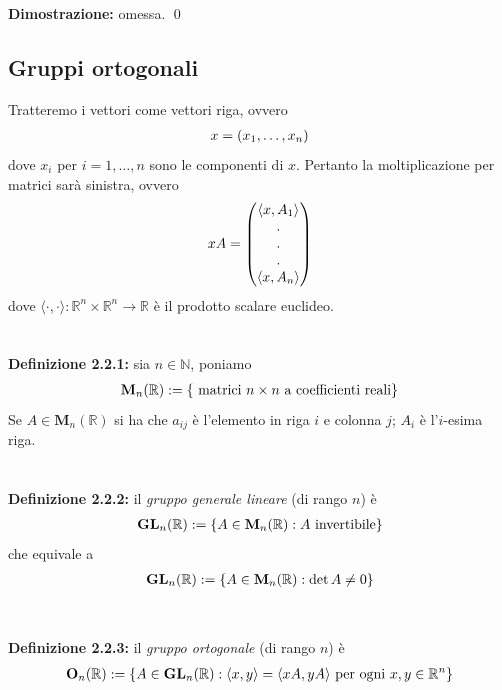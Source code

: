 \documentclass{article}
\begin{document}
\textbf{Dimostrazione:} omessa. \qed
\newpage
\subsection{Gruppi ortogonali}
Tratteremo i vettori come vettori riga, ovvero
\begin{gather}
    x = (x_1, \dots, x_n) \notag
\end{gather}
dove $x_i$ per $i = 1, \dots, n$ sono le componenti di $x$. Pertanto la moltiplicazione per matrici sarà sinistra, ovvero
\begin{gather}
    xA = \begin{pmatrix}
        \langle x, A_1 \rangle \\
        . \\
        . \\
        . \\
        \langle x, A_n \rangle
    \end{pmatrix} \notag
\end{gather}
dove $\langle \cdot, \cdot \rangle : \mathbb{R}^n \times \mathbb{R}^n \longrightarrow \mathbb{R}$ è il prodotto scalare euclideo. \\ \\ \\
\textbf{Definizione 2.2.1:} sia $n \in \mathbb{N}$, poniamo
\begin{gather}
    \mathbf{M}_n(\mathbb{R}) := \{ \text{ matrici $n \times n$ a coefficienti reali} \} \notag
\end{gather}
Se $A \in \mathbf{M}_n(\mathbb{R})$ si ha che $a_{ij}$ è l'elemento in riga $i$ e colonna $j$; $A_i$ è l'$i$-esima riga. \\ \\ \\
\textbf{Definizione 2.2.2:} il \textit{gruppo generale lineare} (di rango $n$) è
\begin{gather}
    \mathbf{GL}_n(\mathbb{R}) := \{ A \in \mathbf{M}_n(\mathbb{R}) : A \text{ invertibile} \} \notag
\end{gather}
che equivale a
\begin{gather}
    \mathbf{GL}_n(\mathbb{R}) := \{ A \in \mathbf{M}_n(\mathbb{R}) : \det A \neq 0 \} \notag
\end{gather} \\ \\
\textbf{Definizione 2.2.3:} il \textit{gruppo ortogonale} (di rango $n$) è
\begin{gather}
    \mathbf{O}_n(\mathbb{R}) := \{ A \in \mathbf{GL}_n(\mathbb{R}) : \langle x, y \rangle = \langle xA, yA \rangle \text{ per ogni } x, y \in \mathbb{R}^n \} \notag
\end{gather} \\ \\
\end{document}
